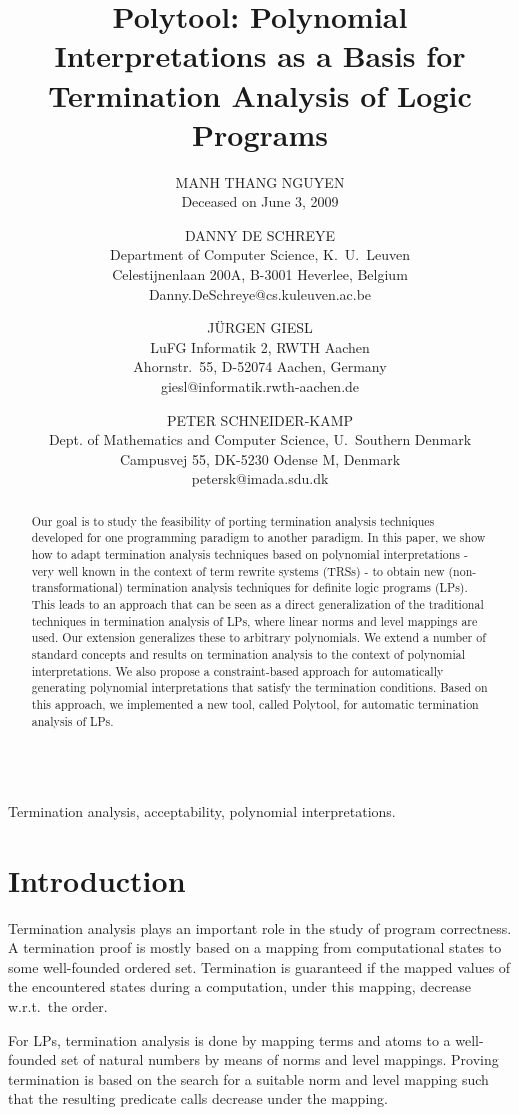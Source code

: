 \documentclass[envcountsame]{tlp}
\author[Manh Thang Nguyen et al.]{
    MANH THANG NGUYEN \\
	Deceased on June 3, 2009
    \and DANNY DE SCHREYE \\
	Department of Computer Science, K.~U.\ Leuven \\ Celestijnenlaan 200A, B-3001 Heverlee,
    Belgium \\
    Danny.DeSchreye@cs.kuleuven.ac.be
    \and J\"{U}RGEN GIESL \\
	LuFG Informatik 2, RWTH Aachen \\ Ahornstr.\ 55,  D-52074 Aachen, Germany \\
    giesl@informatik.rwth-aachen.de
    \and PETER SCHNEIDER-KAMP  \\
	Dept. of Mathematics and Computer Science, U.\ Southern Denmark \\ Campusvej 55, DK-5230 Odense M,
    Denmark \\
    petersk@imada.sdu.dk
        }
\title[Polynomial Interpretations for Termination Analysis of Logic Programs]{\textsf{Polytool}: Polynomial Interpretations as a Basis for Termination Analysis of Logic Programs}
\newcounter{ex:der-lastsymconsctr}
\begin{document}
\maketitle
\begin{abstract}
Our goal is to study the feasibility of
porting termination analysis techniques developed for one programming paradigm to 
another paradigm. 
In this paper, we show how to adapt
termination analysis techniques based on polynomial interpretations - very well
known in the context of term rewrite systems (TRSs) -
to obtain new (non-transformational) 
termination analysis techniques for definite logic programs (LPs). 
This leads to an approach that can be seen as a
direct generalization of the traditional techniques in termination analysis of LPs, where
linear norms and level mappings are used. Our extension generalizes these to
arbitrary polynomials. We extend a number of standard concepts and results on termination
analysis to the context of polynomial interpretations. We also propose a constraint-based
approach for automatically generating polynomial interpretations that satisfy the
termination conditions. Based on this approach, we implemented a new tool, called
\textsf{Polytool}, for automatic termination analysis of LPs.
\\
\\
\end{abstract}

\begin{keywords}
Termination analysis, acceptability, polynomial interpretations.
\end{keywords}

\section{Introduction}\label{sec:intro}
Termination analysis plays an important role in the study of program correctness. A
termination proof is mostly based on a mapping from computational states to some
well-founded ordered set. Termination is guaranteed if the mapped values of the
encountered states during a computation, under this mapping, decrease w.r.t.\ the
order.

For LPs, termination analysis is done by mapping terms and atoms to a
well-founded set of natural numbers by means of norms and level mappings. Proving
termination is based on the search for a suitable norm and level mapping such
that
the resulting predicate calls decrease under the
mapping. 
\end{document}
